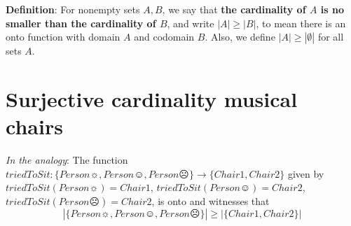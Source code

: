 \documentclass[12pt, oneside]{article}
\begin{document}
{\bf Definition}:  For nonempty sets $A, B$, we say that {\bf the  cardinality of $A$ is  no  smaller than 
the cardinality of  $B$}, and 
write $|A| \geq |B|$, to mean there is an onto function  with domain $A$  and codomain $B$.
Also, we define $|A| \geq |\emptyset|$ for all sets $A$.
 \vfill
\section*{Surjective cardinality musical chairs}


{\it In the analogy}: The function $triedToSit: \{ Person\sun, Person\smiley, Person\frownie \} \to  \{ Chair1, Chair2\} $ given
by $triedToSit(Person\sun) = Chair1$,  $triedToSit(Person\smiley) = Chair2$, 
$triedToSit(Person\frownie) = Chair2$, is onto and witnesses that 
\[
 |\{ Person\sun, Person\smiley, Person\frownie \}| \geq | \{ Chair1, Chair2\} |
\] \vfill
\end{document}
